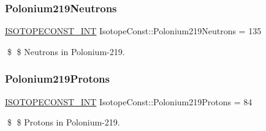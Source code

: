 \subsubsection{\texorpdfstring{Polonium219\+Neutrons}{Polonium219Neutrons}}
{\footnotesize\ttfamily \mbox{\hyperlink{group___isotope_const-_macros_ga5f18360b3e99483a35c32d789e62621c}{I\+S\+O\+T\+O\+P\+E\+C\+O\+N\+S\+T\+\_\+\+I\+NT}} Isotope\+Const\+::\+Polonium219\+Neutrons = 135}

\$ \$ Neutrons in Polonium-\/219. \mbox{\label{group___isotope_const-_polonium-_po219_gaaac3c653782a7eb4536d9225cee516c1}} 
\subsubsection{\texorpdfstring{Polonium219\+Protons}{Polonium219Protons}}
{\footnotesize\ttfamily \mbox{\hyperlink{group___isotope_const-_macros_ga5f18360b3e99483a35c32d789e62621c}{I\+S\+O\+T\+O\+P\+E\+C\+O\+N\+S\+T\+\_\+\+I\+NT}} Isotope\+Const\+::\+Polonium219\+Protons = 84}

\$ \$ Protons in Polonium-\/219. 